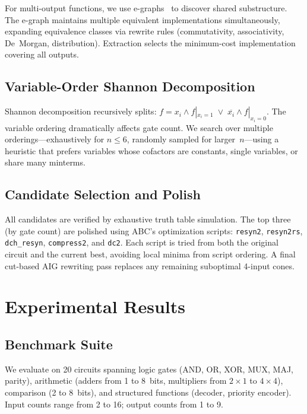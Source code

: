 \documentclass[conference,10pt]{IEEEtran}
\begin{document}
For multi-output functions, we use e-graphs~\cite{egraph_dac} to discover shared substructure. The e-graph maintains multiple equivalent implementations simultaneously, expanding equivalence classes via rewrite rules (commutativity, associativity, De~Morgan, distribution). Extraction selects the minimum-cost implementation covering all outputs.

\subsection{Variable-Order Shannon Decomposition}

Shannon decomposition recursively splits: $f = x_i \land f|_{x_i=1} \;\lor\; \overline{x_i} \land f|_{x_i=0}$. The variable ordering dramatically affects gate count. We search over multiple orderings---exhaustively for $n \leq 6$, randomly sampled for larger~$n$---using a heuristic that prefers variables whose cofactors are constants, single variables, or share many minterms.

\subsection{Candidate Selection and Polish}

All candidates are verified by exhaustive truth table simulation. The top three (by gate count) are polished using ABC's optimization scripts: \texttt{resyn2}, \texttt{resyn2rs}, \texttt{dch\_resyn}, \texttt{compress2}, and \texttt{dc2}. Each script is tried from both the original circuit and the current best, avoiding local minima from script ordering. A final cut-based AIG rewriting pass replaces any remaining suboptimal 4-input cones.

\section{Experimental Results}

\subsection{Benchmark Suite}

We evaluate on 20 circuits spanning logic gates (AND, OR, XOR, MUX, MAJ, parity), arithmetic (adders from 1 to 8~bits, multipliers from $2\times1$ to $4\times4$), comparison (2 to 8~bits), and structured functions (decoder, priority encoder). Input counts range from 2 to 16; output counts from 1 to 9.
\end{document}
